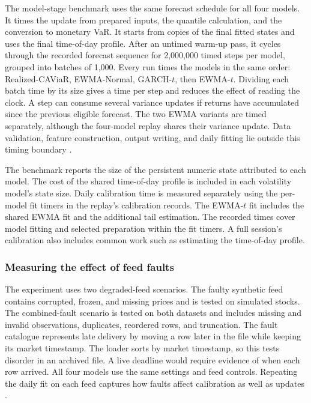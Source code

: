 \documentclass[
	12pt,				%
	openright,			%
	twoside,			%
	a4paper,
	chapter=TITLE,
	english				%
	]{abntex2}
\begin{document}
The model-stage benchmark uses the same forecast schedule for all four models. It times the update from prepared inputs, the quantile calculation, and the conversion to monetary VaR. It starts from copies of the final fitted states and uses the final time-of-day profile. After an untimed warm-up pass, it cycles through the recorded forecast sequence for 2,000,000 timed steps per model, grouped into batches of 1,000. Every run times the models in the same order: Realized-CAViaR, EWMA-Normal, GARCH-$t$, then EWMA-$t$. Dividing each batch time by its size gives a time per step and reduces the effect of reading the clock. A step can consume several variance updates if returns have accumulated since the previous eligible forecast. The two EWMA variants are timed separately, although the four-model replay shares their variance update. Data validation, feature construction, output writing, and daily fitting lie outside this timing boundary \cite{project-atam}.

The benchmark reports the size of the persistent numeric state attributed to each model. The cost of the shared time-of-day profile is included in each volatility model's state size. Daily calibration time is measured separately using the per-model fit timers in the replay's calibration records. The EWMA-$t$ fit includes the shared EWMA fit and the additional tail estimation. The recorded times cover model fitting and selected preparation within the fit timers. A full session's calibration also includes common work such as estimating the time-of-day profile.

\subsubsection{Measuring the effect of feed faults}

The experiment uses two degraded-feed scenarios. The faulty synthetic feed contains corrupted, frozen, and missing prices and is tested on simulated stocks. The combined-fault scenario is tested on both datasets and includes missing and invalid observations, duplicates, reordered rows, and truncation. The fault catalogue represents late delivery by moving a row later in the file while keeping its market timestamp. The loader sorts by market timestamp, so this tests disorder in an archived file. A live deadline would require evidence of when each row arrived. All four models use the same settings and feed controls. Repeating the daily fit on each feed captures how faults affect calibration as well as updates \cite{project-atam}.
\end{document}
